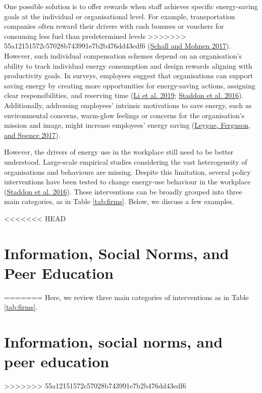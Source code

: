 \documentclass[
  12pt,
  captions=heading]{scrreport}
\begin{document}
One possible solution is to offer rewards when staff achieves specific
energy-saving goals at the individual or organisational level. For
example, transportation companies often reward their drivers with cash
bonuses or vouchers for consuming less fuel than predetermined levels
>>>>>>> 55a12151572c57028b743991e7b2b476dd43edf6
(\protect\hyperlink{ref-schall2017incentivizing}{Schall and Mohnen
2017}). However, such individual compensation schemes depend on an
organisation's ability to track individual energy consumption and design
rewards aligning with productivity goals. In surveys, employees suggest
that organisations can support saving energy by creating more
opportunities for energy-saving actions, assigning clear
responsibilities, and reserving time
(\protect\hyperlink{ref-li2019understanding}{Li et al. 2019};
\protect\hyperlink{ref-staddon2016intervening}{Staddon et al. 2016}).
Additionally, addressing employees' intrinsic motivations to save
energy, such as environmental concerns, warm-glow feelings or concerns
for the organisation's mission and image, might increase employees'
energy saving (\protect\hyperlink{ref-leygue2017saving}{Leygue,
Ferguson, and Spence 2017}).

However, the drivers of energy use in the workplace still need to be
better understood. Large-scale empirical studies considering the vast
heterogeneity of organisations and behaviours are missing. Despite this
limitation, several policy interventions have been tested to change
energy-use behaviour in the workplace
(\protect\hyperlink{ref-staddon2016intervening}{Staddon et al. 2016}).
These interventions can be broadly grouped into three main categories,
as in Table \ref{tab:firms}. Below, we discuss a few examples.

<<<<<<< HEAD
\hypertarget{information-social-norms-and-peer-education}{%
\section{Information, Social Norms, and Peer
Education}\label{information-social-norms-and-peer-education}}
=======
Here, we review three main categories of interventions as in Table
\ref{tab:firms}.

\hypertarget{information-social-norms-and-peer-education}{%
\section{Information, social norms, and peer
education}\label{information-social-norms-and-peer-education}}
>>>>>>> 55a12151572c57028b743991e7b2b476dd43edf6
\end{document}

